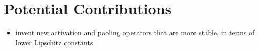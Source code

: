 \documentclass{article}
\begin{document}
\section{Potential Contributions}

\begin{itemize}
	\item invent new activation and pooling operators that are more stable, in terms of lower Lipschitz constants
\end{itemize}









\end{document}
